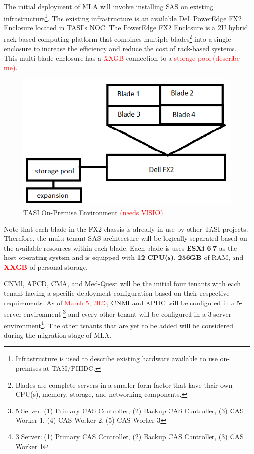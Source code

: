 The initial deployment of MLA will involve installing SAS on existing infrastructure\footnote{Infrastructure is used to describe existing hardware available to use on-premises at TASI/PHIDC.}. The existing infrastructure is  an available Dell PowerEdge FX2 Enclosure located in TASI's NOC. The PowerEdge FX2 Enclosure is a 2U hybrid rack-based computing platform that combines multiple blades\footnote{Blades are complete servers in a smaller form factor that have their own CPU(s), memory, storage, and networking components.} into a single enclosure to increase the efficiency and reduce the cost of rack-based systems. This multi-blade enclosure has a \textcolor{red}{XXGB} connection to a \textcolor{red}{storage pool (describe me)}.

\begin{figure}[H]
    \centering
    \includegraphics[scale = 0.5]{images/currentENV.png}
    \caption{TASI On-Premise Environment \textcolor{red}{(needs VISIO)} }
    \label{Current ENV}
\end{figure}

Note that each blade in the FX2 chassis is already in use by other TASI projects. Therefore, the multi-tenant SAS architecture will be logically separated based on the available resources within each blade. Each blade is uses \textbf{ESXi 6.7} as the host operating system and is equipped with \textbf{12 CPU(s)}, \textbf{256GB} of RAM, and \textcolor{red}{\textbf{XXGB}} of personal storage.

CNMI, APCD, CMA, and Med-Quest will be the initial four tenants with each tenant having a specific deployment configuration based on their respective requirements. As of \textcolor{red}{March 5, 2023}, CNMI and APDC will be configured in a 5-server environment \footnote{5 Server: (1) Primary CAS Controller, (2) Backup CAS Controller, (3) CAS Worker 1, (4) CAS Worker 2, (5) CAS Worker 3} and every other tenant will be configured in a 3-server environment\footnote{3 Server: (1) Primary CAS Controller, (2) Backup CAS Controller, (3) CAS Worker 1}. The other tenants that are yet to be added will be considered during the migration stage of MLA. 

